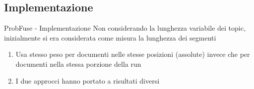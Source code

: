 \subsection{Implementazione}
\begin{frame}{ProbFuse - Implementazione}
	Non considerando la lunghezza variabile dei topic, inizialmente si era considerata come misura la lunghezza dei segmenti\\
	\bigskip
	\begin{enumerate}
		\item Usa stesso peso per documenti nelle stesse posizioni (assolute) invece che per documenti nella stessa porzione della run
		\item I due approcci hanno portato a risultati diversi
	\end{enumerate}
\end{frame}